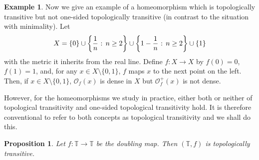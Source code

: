\documentclass[12pt]{article}
\newtheorem{proposition}[theorem]{Proposition}
\theoremstyle{definition}
\newtheorem{example}[theorem]{Example}
\theoremstyle{remark}
\begin{document}
\begin{example}
Now we give an example of a homeomorphism which is topologically transitive but not one-sided topologically transitive (in contrast to the situation with minimality).
Let
\[
X = \{0\} \cup \left\{\frac{1}{n} \hbox{ : } n \ge 2\right\} \cup \left\{1 - \frac{1}{n} \hbox{ : } n \ge 2\right\}
\cup \{1\}
\]
with the metric it inherits from the real line. 
Define $f : X \to X$ by $f(0)=0$, $f(1)=1$, and, for any $x \in X\setminus \{0,1\}$, $f$ maps $x$ to the next point on the left.
Then, if $x \in X\setminus \{0,1\}$, $\mathcal O_f(x)$ is dense in $X$ but $\mathcal O_f^+(x)$ is not dense.
\end{example} 

However, for the homeomorphisms we study in practice, either both or neither of topological transitivity and one-sided topological transitivity hold. It is therefore conventional to refer to both concepts as topological
transitivity and we shall do this.


\begin{proposition} \label{doubling_map_tt}
Let $f: \mathbb T \to \mathbb T$ be the doubling map. Then $(\mathbb T,f)$ is topologically transitive.
\end{proposition}
\end{document}
